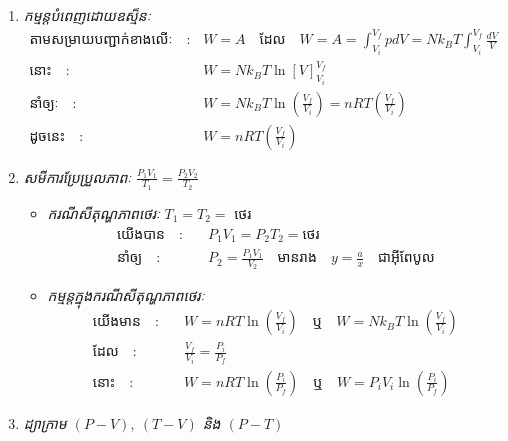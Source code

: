 	\begin{enumerate}[m]
		\item \emph{\kml កម្មន្តបំពេញដោយឧស្ម៏នៈ}
		\begin{align*}
		\text{តាមសម្រាយបញ្ជាក់ខាងលើៈ}\quad :&\quad W=A\quad \text{ដែល}\quad W=A=\int_{V_{i}}^{V_{f}}pdV=Nk_{B}T\int_{V_{i}}^{V_{f}}\frac{dV}{V}\\
		\text{នោះ}\quad :&\quad W=Nk_{B}T\ln\left[V\right]^{V_{f}}_{V_{i}}\\
		\text{នាំឲ្យៈ}\quad :& \quad W=Nk_{B}T\ln\left(\frac{V_f}{V_{i}}\right)=nRT\left(\frac{V_{f}}{V_{i}}\right)\\
		\text{ដូចនេះ}\quad :&\quad W=nRT\left(\frac{V_{f}}{V_{i}}\right)
		\end{align*}
		\item \emph{\kml សមីការប្រែប្រួលភាពៈ} $\frac{P_{1}V_{1}}{T_{1}}=\frac{P_{2}V_{2}}{T_{2}}$
		\begin{itemize}
			\item \emph{ករណីសីតុណ្ហភាពថេរៈ} $T_{1}=T_{2}=$ ថេរ 
			\begin{align*}
				\text{យើងបាន}\quad :&\quad P_{1}V_{1}=P_{2}T_{2}=\text{ថេរ}\\
				\text{នាំឲ្យ}\quad :&\quad P_{2}=\frac{P_1V_{1}}{V_2}\quad \text{មានរាង}\quad y=\frac{a}{x}\quad \text{ជាអុីពែបូល}
			\end{align*}
			\item \emph{កម្មន្តក្នុងករណីសីតុណ្ហភាពថេរៈ} 
			\begin{align*}
					\text{យើងមាន}\quad :&\quad W=nRT\ln\left(\frac{V_{f}}{V_{i}}\right)\quad \text{ឬ}\quad W=Nk_{B}T\ln\left(\frac{V_{f}}{V_{i}}\right)\\
					\text{ដែល}\quad:&\quad \frac{V_{f}}{V_{i}}=\frac{P_{i}}{P_{f}}\\
					\text{នោះ}\quad :&\quad W=nRT\ln\left(\frac{P_{i}}{P_{f}}\right)\quad\text{ឬ}\quad W=P_{i}V_{i}\ln\left(\frac{P_{i}}{P_{f}}\right)
			\end{align*}
		\end{itemize}
		\item \emph{\kml ដ្យាក្រាម $\left(P-V\right),~\left(T-V\right)$ និង $\left(P-T\right)$}
		\begin{figure}[H]
			\caption{ដ្យាក្រាម}
			\begin{subfigure}[t]{.3\textwidth}
				\centering
\end{subfigure}
\end{figure}
\end{enumerate}
